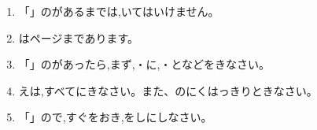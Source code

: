 \documentclass[
  12pt,a4paper,lualatex,ja=standard]{bxjsarticle}
\begin{document}
\centering
\begin{framed}
\begin{flushleft}
\begin{enumerate}
  \item {\large 「」のがあるまでは,いてはいけません。}

  \item {\large {}は\pageref{LastPage}ページまであります。}

  \item {\large 「」のがあったら,まず,・に,・となどをきなさい。}

  \item {\large {}えは,すべてにきなさい。また、のにくはっきりときなさい。}

  \item {\large 「」ので,すぐをおき,をしにしなさい。}
\end{enumerate}
\end{flushleft}
\end{framed}

\vspace{14mm}

\begin{center}
{\large \underline{\hspace{30mm} \hspace{30mm} \hspace{15mm}  \hspace{60mm}}}
\end{center}

\newpage

　 \href{空白ページのための全角スペースあり。}{} \newpage

\pagestyle{plain}
\end{document}
